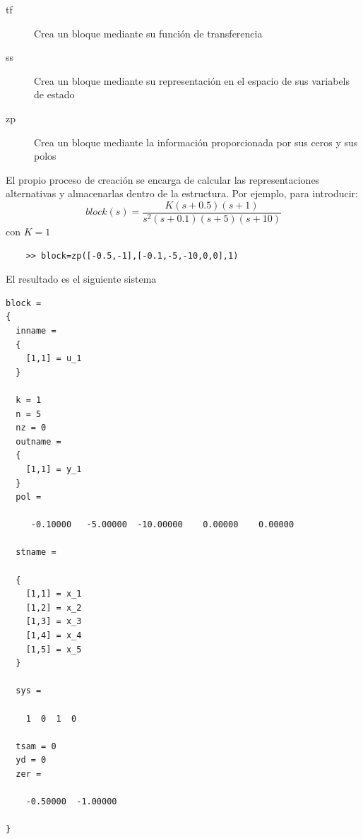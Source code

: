 \begin{description}
\item [tf]Crea un bloque mediante su función de
  transferencia
\item [ss]Crea un bloque mediante su representación en el
  espacio de sus variabels de estado
\item [zp]Crea un bloque mediante la información
  proporcionada por sus ceros y sus polos
\end{description}
El propio proceso de creación se encarga de calcular las
representaciones alternativas y almacenarlas dentro de la estructura.
Por ejemplo, para introducir:
$$block(s)=\frac{K(s+0.5)(s+1)}{s^{2}(s+0.1)(s+5)(s+10)}$$
con $K=1$
\begin{verbatim}
    >> block=zp([-0.5,-1],[-0.1,-5,-10,0,0],1)
\end{verbatim}
El resultado es el siguiente sistema
\begin{verbatim}
block =
{
  inname =
  {
    [1,1] = u_1
  }

  k = 1
  n = 5
  nz = 0
  outname =
  {
    [1,1] = y_1
  }
  pol =

     -0.10000   -5.00000  -10.00000    0.00000    0.00000

  stname =

  {
    [1,1] = x_1
    [1,2] = x_2
    [1,3] = x_3
    [1,4] = x_4
    [1,5] = x_5
  }

  sys =

    1  0  1  0

  tsam = 0
  yd = 0
  zer =

    -0.50000  -1.00000

}
\end{verbatim}

